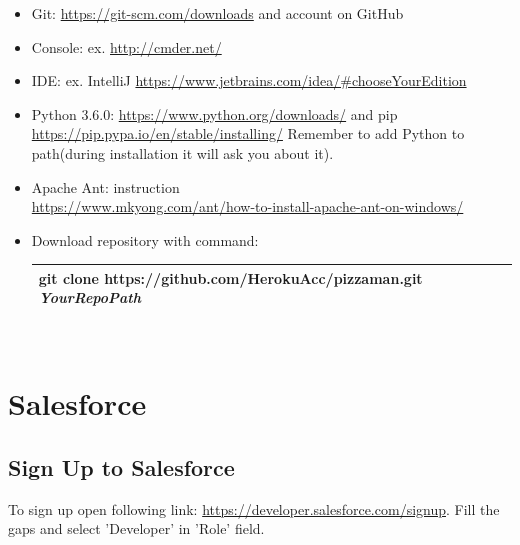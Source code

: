 \documentclass[12pt,a4paper]{article}
\begin{document}
\begin{itemize}
\item Git: \url{https://git-scm.com/downloads} and account on GitHub
\item Console: ex. \url{http://cmder.net/}
\item IDE: ex. IntelliJ \url{https://www.jetbrains.com/idea/#chooseYourEdition}
\item Python 3.6.0: \url{https://www.python.org/downloads/} and pip \url{https://pip.pypa.io/en/stable/installing/} Remember to add Python to path(during installation it will ask you about it).
\item Apache Ant: instruction\\ \url{https://www.mkyong.com/ant/how-to-install-apache-ant-on-windows/} 
\item Download repository with command:\\
\begin{tabular}{|l|}
	\hline
 git clone https://github.com/HerokuAcc/pizzaman.git \textit{YourRepoPath}\\
	\hline
\end{tabular}\\


\end{itemize}

\section{Salesforce}
\subsection{Sign Up to Salesforce}
To sign up open following link: \url{https://developer.salesforce.com/signup}.
Fill the gaps and select 'Developer' in 'Role' field.
\end{document}

